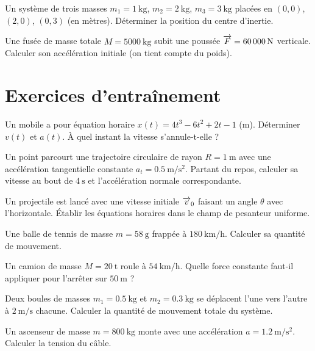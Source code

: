 
\exo{} Un système de trois masses $m_1=\SI{1}{\kilogram}$, $m_2=\SI{2}{\kilogram}$, $m_3=\SI{3}{\kilogram}$ placées en $(0,0)$, $(2,0)$, $(0,3)$ (en mètres). Déterminer la position du centre d’inertie.

\exo{} Une fusée de masse totale $M=\SI{5000}{\kilogram}$ subit une poussée $\overrightarrow{F}=\SI{60000}{\newton}$ verticale. Calculer son accélération initiale (on tient compte du poids).

\section{Exercices d’entraînement}


\exo{} Un mobile a pour équation horaire $x(t)=4t^{3}-6t^{2}+2t-1$ (m). Déterminer $v(t)$ et $a(t)$. À quel instant la vitesse s’annule-t-elle ?

\exo{} Un point parcourt une trajectoire circulaire de rayon $R=\SI{1}{\metre}$ avec une accélération tangentielle constante $a_t=\SI{0.5}{\metre\per\second\squared}$. Partant du repos, calculer sa vitesse au bout de $\SI{4}{\second}$ et l’accélération normale correspondante.

\exo{} Un projectile est lancé avec une vitesse initiale $\overrightarrow{v}_0$ faisant un angle $\theta$ avec l’horizontale. Établir les équations horaires dans le champ de pesanteur uniforme.


\exo{} Une balle de tennis de masse $m=\SI{58}{\gram}$ frappée à $\SI{180}{\kilo\metre\per\hour}$. Calculer sa quantité de mouvement.

\exo{} Un camion de masse $M=\SI{20}{\tonne}$ roule à $\SI{54}{\kilo\metre\per\hour}$. Quelle force constante faut-il appliquer pour l’arrêter sur $\SI{50}{\metre}$ ?

\exo{} Deux boules de masses $m_1=\SI{0.5}{\kilogram}$ et $m_2=\SI{0.3}{\kilogram}$ se déplacent l’une vers l’autre à $\SI{2}{\metre\per\second}$ chacune. Calculer la quantité de mouvement totale du système.


\exo{} Un ascenseur de masse $m=\SI{800}{\kilogram}$ monte avec une accélération $a=\SI{1.2}{\metre\per\second\squared}$. Calculer la tension du câble.

